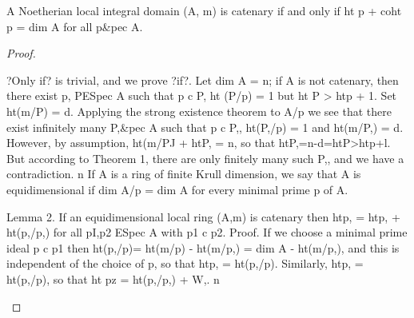 \begin{theorem}[Theorem 31.4]\label{mcrt-auto-theorem-31-4}\uses{}
\begin{mathematicalrecord}
A Noetherian           local integral domain (A, m) is catenary if and
only if
          ht p + coht p = dim A for all p&pec A.
\end{mathematicalrecord}
\end{theorem}
\begin{proof}
\begin{mathematicalrecord}
?Only if? is trivial, and we prove ?if?. Let dim A = n; if A is not
catenary, then there exist p, PESpec A such that
          p c P, ht (P/p) = 1 but ht P > htp + 1.
Set ht(m/P) = d. Applying the strong existence theorem to A/p we see that
there exist infinitely many P,&pec A such that
          p c P,, ht(P,/p) = 1 and ht(m/P,) = d.
However, by assumption, ht(m/PJ + htP, = n, so that
          htP,=n-d=htP>htp+l.
But according to Theorem 1, there are only finitely many such P,, and
we have a contradiction.        n
   If A is a ring of finite Krull dimension, we say that A is equidimensional
if dim A/p = dim A for every minimal prime p of A.

Lemma 2. If an equidimensional     local ring (A,m) is catenary then
         htp, = htp, + ht(p,/p,)     for all pI,p2 ESpec A with p1 c p2.
Proof. If we choose a minimal         prime ideal p c p1 then ht(p,/p)=
ht(m/p) - ht(m/p,) = dim A - ht(m/p,), and this is independent of the
choice of p, so that htp, = ht(p,/p). Similarly, htp, = ht(p,/p),    so that
ht pz = ht(p,/p,)     + W,.      n
\end{mathematicalrecord}
\end{proof}


